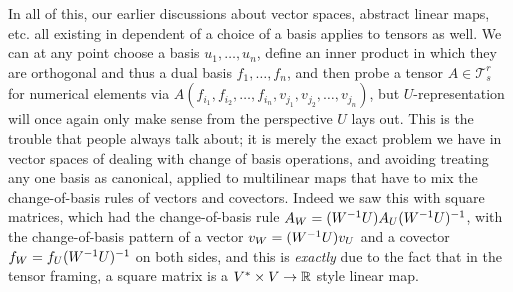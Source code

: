 \documentclass[11pt]{article}
\begin{document}
In all of this, our earlier discussions about vector spaces, abstract linear maps, etc. all existing in dependent of a choice of a basis applies to tensors as well. We can at any point choose a basis $u_1, \dots, u_n$, define an inner product in which they are orthogonal and thus a dual basis $f_1, \dots, f_n$, and then probe a tensor $A \in \mathcal T_s^r$ for numerical elements via $A(f_{i_1}, f_{i_2}, \dots, f_{i_n}, v_{j_1}, v_{j_2}, \dots, v_{j_n})$, but $U$-representation will once again only make sense from the perspective $U$ lays out. This is the  trouble that people always talk about; it is merely the exact problem we have in vector spaces of dealing with change of basis operations, and avoiding treating any one basis as canonical, applied to multilinear maps that have to mix the change-of-basis rules of vectors and covectors. Indeed we saw this with square matrices, which had the change-of-basis rule $A_W = (W^{-1} U) A_U (W^{-1} U)^{-1}$, with the change-of-basis pattern of a vector $v_W = (W^{-1} U) v_U$ and a covector $f_W = f_U (W^{-1} U)^{-1}$ on both sides, and this is \emph{exactly} due to the fact that in the tensor framing, a square matrix is a $V^* \times V \to \mathbb{R}$ style linear map.
\end{document}
